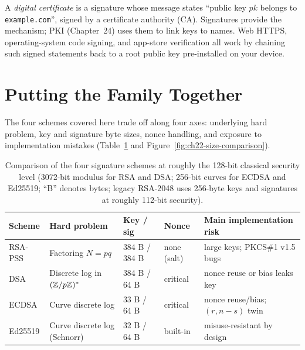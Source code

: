 \begin{intuitionbox}
A \emph{digital certificate} is a signature whose message states ``public key $pk$ belongs to \texttt{example.com}'', signed by a certificate authority (CA). Signatures provide the mechanism; PKI (Chapter~24) uses them to link keys to names. Web HTTPS, operating-system code signing, and app-store verification all work by chaining such signed statements back to a root public key pre-installed on your device.
\end{intuitionbox}

\section{Putting the Family Together}
\label{ch22:summary}

The four schemes covered here trade off along four axes: underlying hard problem, key and signature byte sizes, nonce handling, and exposure to implementation mistakes (Table~\ref{ch22:tab-summary} and Figure~\ref{fig:ch22-size-comparison}).

\begin{table}[htbp]
\centering
\small
\renewcommand{\arraystretch}{1.28}
\begin{tabular}{@{}lllll@{}}
\toprule
\textbf{Scheme} & \textbf{Hard problem} & \textbf{Key / sig} & \textbf{Nonce} & \textbf{Main implementation risk} \\
\midrule
RSA-PSS    & Factoring $N = pq$           & 384 B / 384 B & none (salt) & large keys; PKCS\#1 v1.5 bugs \\
DSA        & Discrete log in $(\mathbb{Z}/p\mathbb{Z})^{*}$    & 384 B / 64 B  & critical    & nonce reuse or bias leaks key \\
ECDSA      & Curve discrete log           & 33 B / 64 B   & critical    & nonce reuse/bias; $(r, n-s)$ twin \\
Ed25519    & Curve discrete log (Schnorr) & 32 B / 64 B   & built-in    & misuse-resistant by design \\
\bottomrule
\end{tabular}
\caption{Comparison of the four signature schemes at roughly the 128-bit classical security level (3072-bit modulus for RSA and DSA; 256-bit curves for ECDSA and Ed25519; ``B'' denotes bytes; legacy RSA-2048 uses 256-byte keys and signatures at roughly 112-bit security).}
\label{ch22:tab-summary}
\end{table}

